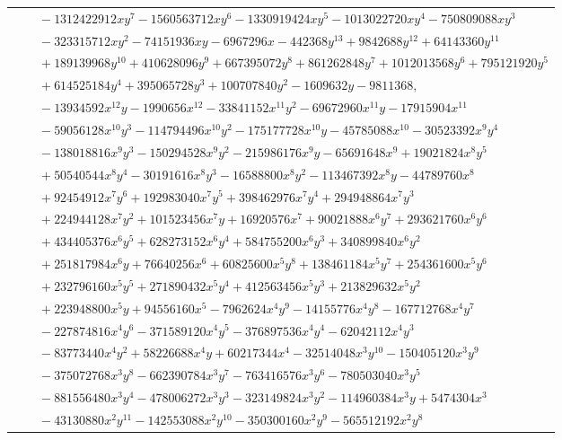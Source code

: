 \documentclass[11pt]{article}
\begin{document}
\begin{longtable}{@{}ll@{}}
 & $\quad -1312422912xy^{7}-1560563712xy^{6}-1330919424xy^{5}-1013022720xy^{4}-750809088xy^{3}$\\
 & $\quad -323315712xy^{2}-74151936xy-6967296x-442368y^{13}+9842688y^{12}+64143360y^{11}$\\
 & $\quad +189139968y^{10}+410628096y^{9}+667395072y^{8}+861262848y^{7}+1012013568y^{6}+795121920y^{5}$\\
 & $\quad +614525184y^{4}+395065728y^{3}+100707840y^{2}-1609632y-9811368,$\\
 & $\quad -13934592x^{12}y-1990656x^{12}-33841152x^{11}y^{2}-69672960x^{11}y-17915904x^{11}$\\
 & $\quad -59056128x^{10}y^{3}-114794496x^{10}y^{2}-175177728x^{10}y-45785088x^{10}-30523392x^{9}y^{4}$\\
 & $\quad -138018816x^{9}y^{3}-150294528x^{9}y^{2}-215986176x^{9}y-65691648x^{9}+19021824x^{8}y^{5}$\\
 & $\quad +50540544x^{8}y^{4}-30191616x^{8}y^{3}-16588800x^{8}y^{2}-113467392x^{8}y-44789760x^{8}$\\
 & $\quad +92454912x^{7}y^{6}+192983040x^{7}y^{5}+398462976x^{7}y^{4}+294948864x^{7}y^{3}$\\
 & $\quad +224944128x^{7}y^{2}+101523456x^{7}y+16920576x^{7}+90021888x^{6}y^{7}+293621760x^{6}y^{6}$\\
 & $\quad +434405376x^{6}y^{5}+628273152x^{6}y^{4}+584755200x^{6}y^{3}+340899840x^{6}y^{2}$\\
 & $\quad +251817984x^{6}y+76640256x^{6}+60825600x^{5}y^{8}+138461184x^{5}y^{7}+254361600x^{5}y^{6}$\\
 & $\quad +232796160x^{5}y^{5}+271890432x^{5}y^{4}+412563456x^{5}y^{3}+213829632x^{5}y^{2}$\\
 & $\quad +223948800x^{5}y+94556160x^{5}-7962624x^{4}y^{9}-14155776x^{4}y^{8}-167712768x^{4}y^{7}$\\
 & $\quad -227874816x^{4}y^{6}-371589120x^{4}y^{5}-376897536x^{4}y^{4}-62042112x^{4}y^{3}$\\
 & $\quad -83773440x^{4}y^{2}+58226688x^{4}y+60217344x^{4}-32514048x^{3}y^{10}-150405120x^{3}y^{9}$\\
 & $\quad -375072768x^{3}y^{8}-662390784x^{3}y^{7}-763416576x^{3}y^{6}-780503040x^{3}y^{5}$\\
 & $\quad -881556480x^{3}y^{4}-478006272x^{3}y^{3}-323149824x^{3}y^{2}-114960384x^{3}y+5474304x^{3}$\\
 & $\quad -43130880x^{2}y^{11}-142553088x^{2}y^{10}-350300160x^{2}y^{9}-565512192x^{2}y^{8}$\\

\end{longtable}
\end{document}
